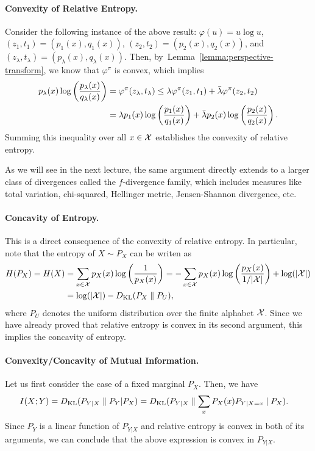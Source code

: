 \documentclass[12pt]{article}
\begin{document}
\paragraph{Convexity of Relative Entropy.} Consider the following instance of the above result: $\varphi(u) = u \log u$, $(z_1, t_1) = (p_1(x), q_1(x))$, $(z_2, t_2) = (p_2(x), q_2(x))$, and $(z_\lambda, t_\lambda) = (p_\lambda(x), q_\lambda(x))$. Then, by~Lemma~\ref{lemma:perspective-transform}, we know that $\varphi^\pi$ is convex, which implies 
\begin{align}
	p_\lambda(x) \log \left( \frac{p_\lambda(x)}{q_\lambda(x)}\right) &= \varphi^\pi(z_\lambda, t_\lambda) \leq \lambda \varphi^\pi(z_1, t_1) + \bar{\lambda} \varphi^{\pi}(z_2, t_2) \\ 
	&= \lambda p_1(x) \log \left( \frac{p_1(x)}{q_1(x)} \right) + \bar{\lambda} p_2(x) \log \left( \frac{p_2(x)}{q_2(x)} \right). 
\end{align}
Summing this inequality over all $x \in {\cal X}$ establishes the convexity of relative entropy. 
\begin{remark}
	As we will see in the next lecture, the same argument directly extends to a larger class of divergences called the $f$-divergence family, which includes measures like total variation, chi-squared, Hellinger metric, Jensen-Shannon divergence, etc.  
\end{remark}


\paragraph{Concavity of Entropy.} This is a direct consequence of the convexity of relative entropy. In particular, note that the entropy of $X \sim P_X$ can be writen as 
\begin{align}
H(P_X) = H(X) &= \sum_{x \in {\cal X}} p_X(x) \log \left( \frac{1}{p_X(x)} \right) = -\sum_{x \in {\cal X}} p_X(x) \log \left( \frac{p_X(x)}{1/|{\cal X}|} \right) + \log(|{\cal X}|) \\
& = \log(|{\cal X}|) - D_{\text{KL}}(P_X \parallel P_U), 
\end{align}
where $P_U$ denotes the uniform distribution over the finite alphabet ${\cal X}$. Since we have already proved that relative entropy is convex in its second argument, this implies the concavity of entropy. 

\paragraph{Convexity/Concavity of Mutual Information.} Let us first consider the case of a fixed marginal $P_X$. Then, we have 
\begin{align}
I(X;Y) &= D_{\text{KL}}(P_{Y|X} \parallel P_Y | P_X)  = D_{\text{KL}}(P_{Y|X} \parallel \sum_{x} P_X(x) P_{Y|X=x} \mid P_X). 
\end{align}
Since $P_Y$ is a linear function of $P_{Y|X}$ and relative entropy is convex in both of its arguments, we can conclude that the above expression is convex in $P_{Y|X}$. 
\end{document}
